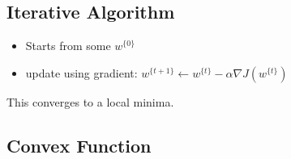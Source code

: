 \documentclass{article}
\begin{document}
\subsection{Iterative Algorithm}
\begin{itemize}
    \item Starts from some $w^{\{0\}}$
    \item update using gradient: $w^{\{t+1\}} \leftarrow w^{\{t\}} - \alpha \nabla J(w^{\{t\}})$
\end{itemize}
This converges to a local minima.
\subsection{Convex Function}
\end{document}
